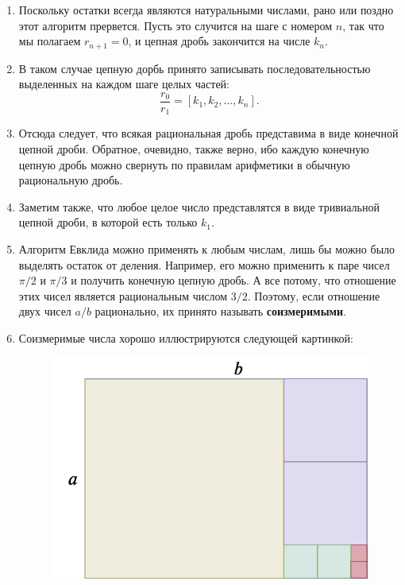 \begin{enumerate}
\item Поскольку остатки всегда являются натуральными числами, рано или поздно этот алгоритм прервется. Пусть это случится на шаге с номером $n$, так что мы полагаем $r_{n+1}=0$, и цепная дробь закончится на числе $k_n$.
\item В таком случае цепную дорбь принято записывать последовательностью выделенных на каждом шаге целых частей:
$$
\frac{r_0}{r_1} = [k_1,k_2,\dots,k_n].
$$
\item Отсюда следует, что всякая рациональная дробь представима в виде конечной цепной дроби. Обратное, очевидно, также верно, ибо каждую конечную цепную дробь можно свернуть по правилам арифметики в обычную рациональную дробь.
\item Заметим также, что любое целое число представлятся в виде тривиальной цепной дроби, в которой есть только $k_1$.
\item Алгоритм Евклида можно применять к любым числам, лишь бы можно было выделять остаток от деления. Например, его можно применить к паре чисел $\pi/2$ и $\pi/3$ и получить конечную цепную дробь. А все потому, что отношение этих чисел является рациональным числом $3/2$. Поэтому, если отношение двух чисел $a/b$ рационально, их принято называть \textbf{соизмеримыми}.
\item\label{soizm} Соизмеримые числа хорошо иллюстрируются следующей картинкой:
\begin{figure}[hbt!]
\begin{center}
\includegraphics[scale=0.3]{soizmer.png}
\end{center}
\caption{}\label{soizmer}
\end{figure}

\end{enumerate}
